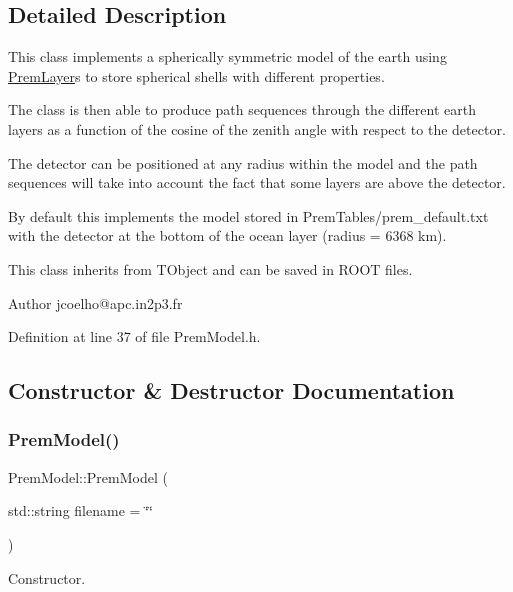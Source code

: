 \subsection{Detailed Description}
This class implements a spherically symmetric model of the earth using \hyperlink{structOscProb_1_1PremLayer}{Prem\+Layer}\textquotesingle{}s to store spherical shells with different properties.

The class is then able to produce path sequences through the different earth layers as a function of the cosine of the zenith angle with respect to the detector.

The detector can be positioned at any radius within the model and the path sequences will take into account the fact that some layers are above the detector.

By default this implements the model stored in Prem\+Tables/prem\+\_\+default.\+txt with the detector at the bottom of the ocean layer (radius = 6368 km).

This class inherits from T\+Object and can be saved in R\+O\+OT files.

\begin{DoxyAuthor}{Author}
jcoelho@apc.\+in2p3.\+fr 
\end{DoxyAuthor}


Definition at line 37 of file Prem\+Model.\+h.



\subsection{Constructor \& Destructor Documentation}
\mbox{\label{classOscProb_1_1PremModel_a959f8da5c78881b950bd647b67c1ef9b}} 
\subsubsection{\texorpdfstring{Prem\+Model()}{PremModel()}}
{\footnotesize\ttfamily Prem\+Model\+::\+Prem\+Model (\begin{DoxyParamCaption}\item[{std\+::string}]{filename = {\ttfamily \char`\"{}\char`\"{}} }\end{DoxyParamCaption})}

Constructor.

